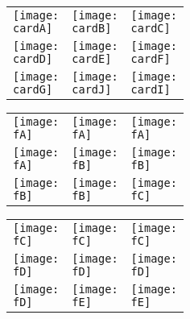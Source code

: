\documentclass[a4paper]{article}
\newlength{\cardW}
\newlength{\cardH}
\newcommand{\cardA}{fig/boss.png}
\newcommand{\cardB}{fig/detective.png}
\newcommand{\cardC}{fig/doctor.png}
\newcommand{\cardD}{fig/godfather.png}
\newcommand{\cardE}{fig/girl.png}
\newcommand{\cardF}{fig/insane.png}
\newcommand{\cardG}{fig/jailer.png}
\newcommand{\cardJ}{fig/peeker.png}
\newcommand{\cardI}{fig/vigilante.png}
\newcommand{\fA}{fig/4lover.png}
\newcommand{\fB}{fig/4outsider.png}
\newcommand{\fC}{fig/4thug.png}
\newcommand{\fD}{fig/4villager.png}
\newcommand{\fE}{fig/4villager2.png}
\begin{document}
\pagestyle{empty}

\begin{figure}[H]
\centering
\begin{tabular}{|>{\centering\arraybackslash}m{\cardW}|>{\centering\arraybackslash}m{\cardW}|>{\centering\arraybackslash}m{\cardW}|}
    \texttt{[image: \\cardA]} &
    \texttt{[image: \\cardB]} &
    \texttt{[image: \\cardC]} \\
    \texttt{[image: \\cardD]} &
    \texttt{[image: \\cardE]} &
    \texttt{[image: \\cardF]} \\
    \texttt{[image: \\cardG]} &
    \texttt{[image: \\cardJ]} &
    \texttt{[image: \\cardI]} \\
\end{tabular}
\end{figure}


\newpage

\begin{figure}[H]
\centering
\begin{tabular}{|>{\centering\arraybackslash}m{\cardW}|>{\centering\arraybackslash}m{\cardW}|>{\centering\arraybackslash}m{\cardW}|}
    \texttt{[image: \\fA]} &
    \texttt{[image: \\fA]} &
    \texttt{[image: \\fA]} \\
    \texttt{[image: \\fA]} &
    \texttt{[image: \\fB]} &
    \texttt{[image: \\fB]} \\
    \texttt{[image: \\fB]} &
    \texttt{[image: \\fB]} &
    \texttt{[image: \\fC]} \\
\end{tabular}
\end{figure}


\newpage

\begin{figure}[H]
\centering
\begin{tabular}{|>{\centering\arraybackslash}m{\cardW}|>{\centering\arraybackslash}m{\cardW}|>{\centering\arraybackslash}m{\cardW}|}
    \texttt{[image: \\fC]} &
    \texttt{[image: \\fC]} &
    \texttt{[image: \\fC]} \\
    \texttt{[image: \\fD]} &
    \texttt{[image: \\fD]} &
    \texttt{[image: \\fD]} \\
    \texttt{[image: \\fD]} &
    \texttt{[image: \\fE]} &
    \texttt{[image: \\fE]} \\
\end{tabular}
\end{figure}
\end{document}
